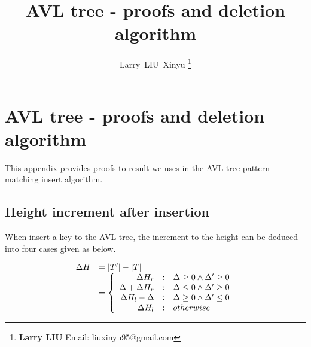 \documentclass[UTF8]{article}
\begin{document}


\title{AVL tree - proofs and deletion algorithm}

\author{Larry~LIU~Xinyu
\thanks{{\bfseries Larry LIU} \newline
  Email: liuxinyu95@gmail.com \newline}
  }

\maketitle
\fi


\ifx\wholebook\relax
\chapter{AVL tree - proofs and deletion algorithm}
\fi


This appendix provides proofs to result we uses in the AVL tree pattern
matching insert algorithm.

\section{Height increment after insertion}

When insert a key to the AVL tree, the increment to the height can be deduced
into four cases given as below.

\[
\begin{array}{rl}
  \Delta H & = |T'| - |T| \\
              & = \left \{
                  \begin{array}{r@{\quad:\quad}l}
                  \Delta H_r & \Delta \geq 0 \land \Delta' \geq 0 \\
                  \Delta + \Delta H_r & \Delta \leq 0 \land \Delta' \geq 0 \\
                  \Delta H_l - \Delta & \Delta \geq 0 \land \Delta' \leq 0 \\
                  \Delta H_l & otherwise
                  \end{array} \right .
\end{array}
\]
\end{document}
